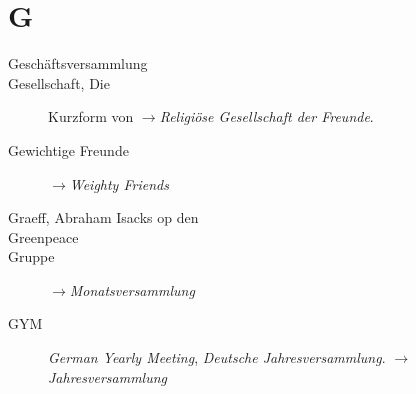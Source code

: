 \section*{G}

\articlesize

\begin{description}
 \item[Geschäftsversammlung]

 \item[Gesellschaft, Die] Kurzform von $\to$\textit{Religiöse Gesellschaft der Freunde}.

\item[Gewichtige Freunde] $\to$\textit{Weighty Friends}

 \item[Graeff, Abraham Isacks op den]

 \item[Greenpeace]

\item[Gruppe] $\to$\textit{Monatsversammlung}

\item[GYM] \textit{German Yearly Meeting}, \textit{Deutsche Jahresversammlung}. $\to$\textit{Jahresversammlung}
 \end{description}

\normalsize